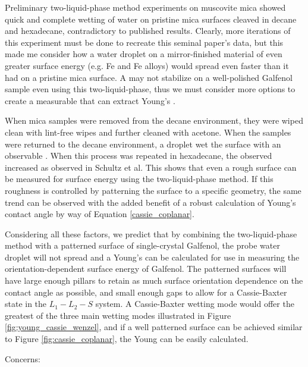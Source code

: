 Preliminary two-liquid-phase method experiments on muscovite mica showed quick and complete wetting of water on pristine mica surfaces cleaved in decane and hexadecane, contradictory to published results.\cite{Schultz1992} Clearly, more iterations of this experiment must be done to recreate this seminal paper's data, but this made me consider how a water droplet on a mirror-finished material of even greater surface energy (e.g. Fe and Fe alloys) would spread even faster than it had on a pristine mica surface. A \ca may not stabilize on a well-polished Galfenol sample even using this two-liquid-phase, thus we must consider more options to create a measurable \ca that can extract Young's \ca. 

When mica samples were removed from the decane environment, they were wiped clean with lint-free wipes and further cleaned with acetone. When the samples were returned to the decane environment, a droplet wet the surface with an observable \ca. When this process was repeated in hexadecane, the observed \ca increased as observed in Schultz et al. This shows that even a rough surface can be measured for surface energy using the two-liquid-phase method. If this roughness is controlled by patterning the surface to a specific geometry, the same trend can be observed with the added benefit of a robust calculation of Young's contact angle by way of Equation \ref{cassie_coplanar}. 

Considering all these factors, we predict that by combining the two-liquid-phase method with a patterned surface of single-crystal Galfenol, the probe water droplet will not spread and a Young's \ca can be calculated for use in measuring the orientation-dependent surface energy of Galfenol. The patterned surfaces will have large enough pillars to retain as much surface orientation dependence on the contact angle as possible, and small enough gaps to allow for a Cassie-Baxter state in the $ L_1-L_2-S $ system. A Cassie-Baxter wetting mode would offer the greatest \ca of the three main wetting modes illustrated in Figure \ref{fig:young_cassie_wenzel}, and if a well patterned surface can be achieved similar to Figure \ref{fig:cassie_coplanar}, the Young \ca can be easily calculated. 

Concerns:



